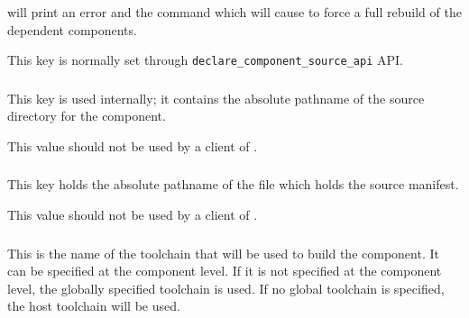 \lmsbw will print an error and the command which will cause \lmsbw to
force a full rebuild of the dependent components.

This key is normally set through
\texttt{declare\_component\_source\_api} API.


\subsubsection{}
This key is used internally; it contains the absolute pathname of the
source directory for the component.

This value should not be used by a client of \lmsbw.

\subsubsection{}

This key holds the absolute pathname of the file which holds the
source \mtree manifest.

This value should not be used by a client of \lmsbw.

\subsubsection{}

This is the name of the toolchain that will be used to build the
component.  It can be specified at the component level.  If it is not
specified at the component level, the globally specified toolchain is
used.  If no global toolchain is specified, the host toolchain will be
used.
